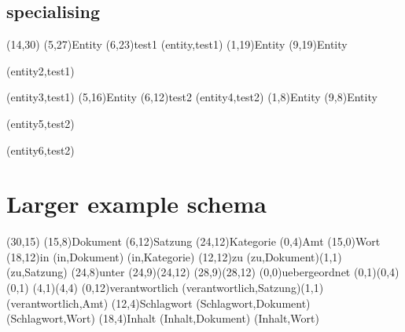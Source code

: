 \documentclass[a4paper,11pt]{article}
\begin{document}
\subsection{specialising}

\begin{schema}(14,30)
  \entity[entity](5,27){Entity}
  \dspecial(6,23){test1}
  \connection(entity,test1){}
  \entity[entity2](1,19){Entity}
  \entity[entity3](9,19){Entity}
  \special(entity2,test1)
  \special(entity3,test1)
  \entity[entity4](5,16){Entity}
  \ospecial*(6,12){test2}
  \connection(entity4,test2){}
  \entity[entity5](1,8){Entity}
  \entity[entity6](9,8){Entity}
  \special(entity5,test2)
  \special(entity6,test2)
\end{schema}



\section{Larger example schema}

\setlength{\hermunit}{.5cm}
\begin{schema}(30,15)
\entity(15,8){Dokument}
%
\entity(6,12){Satzung}
%
\entity(24,12){Kategorie}
%
\entity(0,4){Amt}
%
\entity(15,0){Wort}
%
\relation(18,12){in}
\conn(in,Dokument){}
\conn(in,Kategorie){}
%
\relation(12,12){zu}
\conn(zu,Dokument){(1,1)}
\conn(zu,Satzung){}
%
\relation(24,8){unter}
\conn*(24,9)(24,12){}
\conn*(28,9)(28,12){}
%
\relation(0,0){uebergeordnet}
\conn*(0,1)(0,4){(0,1)}
\conn*(4,1)(4,4){}
%
\relation(0,12){verantwortlich}
\conn(verantwortlich,Satzung){(1,1)}
\conn(verantwortlich,Amt){}
%
\relation(12,4){Schlagwort}
\conn(Schlagwort,Dokument){}
\conn(Schlagwort,Wort){}
%
\relation(18,4){Inhalt}
\conn(Inhalt,Dokument){}
\conn(Inhalt,Wort){}
\end{schema}
\end{document}
